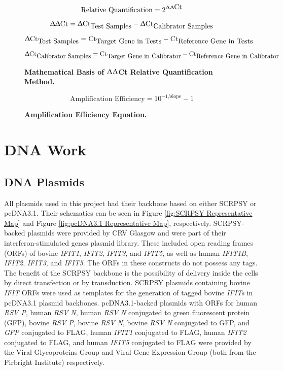 \begin{figure}
$$\mbox{Relative Quantification} = 2^{\Updelta\Updelta \mbox{Ct}}$$
$$\Updelta\Updelta \mbox{Ct} = \Updelta \mbox{Ct}_{\mbox{Test Samples}}-\Updelta \mbox{Ct}_{\mbox{Calibrator Samples}}$$
$$\Updelta \mbox{Ct}_{\mbox{Test Samples}} = \mbox{Ct}_{\mbox{Target Gene in Tests}}-\mbox{Ct}_{\mbox{Reference Gene in Tests}}$$
$$\Updelta \mbox{Ct}_{\mbox{Calibrator Samples}} = \mbox{Ct}_{\mbox{Target Gene in Calibrator}}-\mbox{Ct}_{\mbox{Reference Gene in Calibrator}}$$
\caption[Mathematical Basis of $\Updelta$$\Updelta$Ct Relative Quantification Method.]{\textbf{Mathematical Basis of $\Updelta$$\Updelta$Ct Relative Quantification Method.}}
\label{eq:Mathematical Bases of delta delta Ct Relative Quantification Method}
\end{figure}

\begin{figure}
$$\mbox{Amplification Efficiency} = 10^{-1/\mbox{slope}}-1$$
\caption[Amplification Efficiency Equation.]{\textbf{Amplification Efficiency Equation.}}
\label{eq:Amplification Efficiency Equation}
\end{figure}

\section{DNA Work} \label{sec:DNA Work}
\subsection{DNA Plasmids} \label{subsec:DNA Plasmids}
All plasmids used in this project had their backbone based on either SCRPSY or pcDNA3.1. Their schematics can be seen in Figure \ref{fig:SCRPSY Representative Map} and Figure \ref{fig:pcDNA3.1 Representative Map}, respectively. SCRPSY-backed plasmids were provided by CRV Glasgow and were part of their interferon-stimulated genes plasmid library. These included open reading frames (ORFs) of bovine \textit{IFIT1}, \textit{IFIT2}, \textit{IFIT3}, and \textit{IFIT5}, as well as human \textit{IFIT1B}, \textit{IFIT2}, \textit{IFIT3}, and \textit{IFIT5}. The ORFs in these constructs do not possess any tags. The benefit of the SCRPSY backbone is the possibility of delivery inside the cells by direct transfection or by transduction. SCRPSY plasmids containing bovine \textit{IFIT} ORFs were used as templates for the generation of tagged bovine \textit{IFITs} in pcDNA3.1 plasmid backbones. pcDNA3.1-backed plasmids with ORFs for human \textit{RSV P}, human \textit{RSV N}, human \textit{RSV N} conjugated to green fluorescent protein (GFP), bovine \textit{RSV P}, bovine \textit{RSV N}, bovine \textit{RSV N} conjugated to GFP, and \textit{GFP} conjugated to FLAG, human \textit{IFIT1} conjugated to FLAG, human \textit{IFIT2} conjugated to FLAG, and human \textit{IFIT5} conjugated to FLAG were provided by the Viral Glycoproteins Group and Viral Gene Expression Group (both from the Pirbright Institute) respectively.


